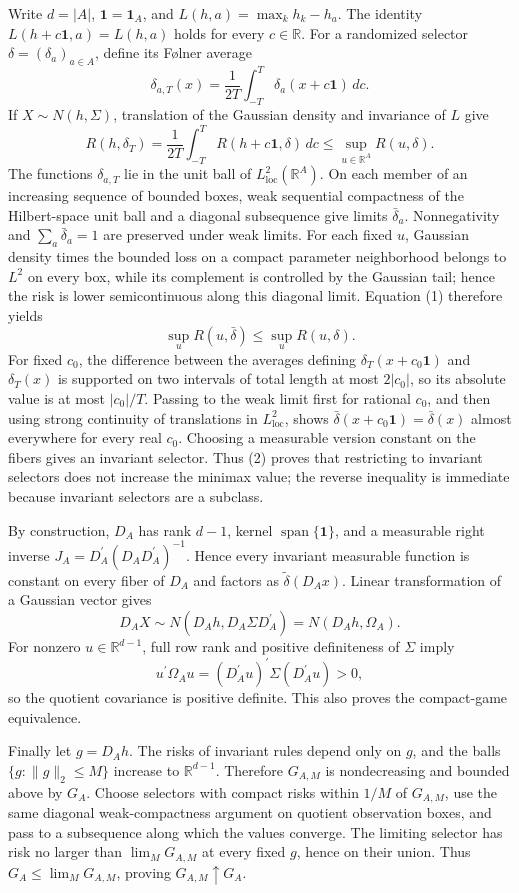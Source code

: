 Write \(d=|A|\), \(\mathbf 1=\mathbf 1_A\), and \(L(h,a)=\max_k h_k-h_a\).  The identity \(L(h+c\mathbf 1,a)=L(h,a)\) holds for every \(c\in\mathbb R\).  For a randomized selector \(\delta=(\delta_a)_{a\in A}\), define its Følner average
\[
\delta_{a,T}(x)=\frac1{2T}\int_{-T}^{T}\delta_a(x+c\mathbf 1)\,dc.
\]
If \(X\sim N(h,\Sigma)\), translation of the Gaussian density and invariance of \(L\) give
\[
R(h,\delta_T)=\frac1{2T}\int_{-T}^{T}R(h+c\mathbf 1,\delta)\,dc
\leq \sup_{u\in\mathbb R^A}R(u,\delta). \tag{1}
\]
The functions \(\delta_{a,T}\) lie in the unit ball of \(L^2_{\mathrm{loc}}(\mathbb R^A)\).  On each member of an increasing sequence of bounded boxes, weak sequential compactness of the Hilbert-space unit ball and a diagonal subsequence give limits \(\bar\delta_a\).  Nonnegativity and \(\sum_a\bar\delta_a=1\) are preserved under weak limits.  For each fixed \(u\), Gaussian density times the bounded loss on a compact parameter neighborhood belongs to \(L^2\) on every box, while its complement is controlled by the Gaussian tail; hence the risk is lower semicontinuous along this diagonal limit.  Equation (1) therefore yields
\[
\sup_uR(u,\bar\delta)\leq\sup_uR(u,\delta). \tag{2}
\]
For fixed \(c_0\), the difference between the averages defining \(\delta_T(x+c_0\mathbf 1)\) and \(\delta_T(x)\) is supported on two intervals of total length at most \(2|c_0|\), so its absolute value is at most \(|c_0|/T\).  Passing to the weak limit first for rational \(c_0\), and then using strong continuity of translations in \(L^2_{\mathrm{loc}}\), shows \(\bar\delta(x+c_0\mathbf 1)=\bar\delta(x)\) almost everywhere for every real \(c_0\).  Choosing a measurable version constant on the fibers gives an invariant selector.  Thus (2) proves that restricting to invariant selectors does not increase the minimax value; the reverse inequality is immediate because invariant selectors are a subclass.

By construction, \(D_A\) has rank \(d-1\), kernel \(\operatorname{span}\{\mathbf 1\}\), and a measurable right inverse \(J_A=D_A^{\prime}(D_AD_A^{\prime})^{-1}\).  Hence every invariant measurable function is constant on every fiber of \(D_A\) and factors as \(\tilde\delta(D_Ax)\).  Linear transformation of a Gaussian vector gives
\[
D_AX\sim N(D_Ah,D_A\Sigma D_A^{\prime})=N(D_Ah,\Omega_A).
\]
For nonzero \(u\in\mathbb R^{d-1}\), full row rank and positive definiteness of \(\Sigma\) imply
\[
u^{\prime}\Omega_Au=(D_A^{\prime}u)^{\prime}\Sigma(D_A^{\prime}u)>0,
\]
so the quotient covariance is positive definite.  This also proves the compact-game equivalence.

Finally let \(g=D_Ah\).  The risks of invariant rules depend only on \(g\), and the balls \(\{g:\lVert g\rVert_2\leq M\}\) increase to \(\mathbb R^{d-1}\).  Therefore \(G_{A,M}\) is nondecreasing and bounded above by \(G_A\).  Choose selectors with compact risks within \(1/M\) of \(G_{A,M}\), use the same diagonal weak-compactness argument on quotient observation boxes, and pass to a subsequence along which the values converge.  The limiting selector has risk no larger than \(\lim_MG_{A,M}\) at every fixed \(g\), hence on their union.  Thus \(G_A\leq\lim_MG_{A,M}\), proving \(G_{A,M}\uparrow G_A\).